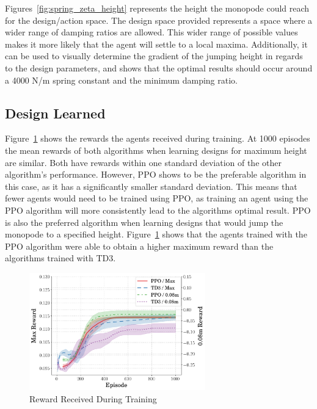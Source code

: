 \documentclass[10pt,twocolumn,letterpaper]{article}
\begin{document}
Figures~\ref{fig:spring_zeta_height} represents the height the monopode could reach for the design/action space. The design space provided represents a space where a wider range of damping ratios are allowed. This wider range of possible values makes it more likely that the agent will settle to a local maxima. Additionally, it can be used to visually determine the gradient of the jumping height in regards to the design parameters, and shows that the optimal results should occur around a 4000 N/m spring constant and the minimum damping ratio.

\subsection{Design Learned}

Figure~\ref{fig:rew_vs_step} shows the rewards the agents received during training. 
At 1000 episodes the mean rewards of both algorithms when learning designs for maximum height are similar. Both have rewards within one standard deviation of the other algorithm's performance. However, PPO shows to be the preferable algorithm in this case, as it has a significantly smaller standard deviation.
This means that fewer agents would need to be trained using PPO, as training an agent using the PPO algorithm will more consistently lead to the algorithms optimal result. PPO is also the preferred algorithm when learning designs that would jump the monopode to a specified height. Figure~\ref{fig:rew_vs_step} shows that the agents trained with the PPO algorithm were able to obtain a higher maximum reward than the algorithms trained with TD3.

\begin{figure}[t]
\begin{center}
        \includegraphics[width = 3in]{figures/ppo_vs_td3/avg_rew_comp.png}
        \caption{Reward Received During Training}
        \label{fig:rew_vs_step}
\end{center}
\end{figure}
%
\end{document}
